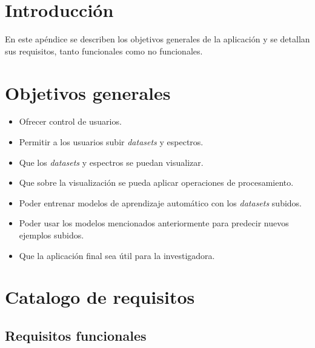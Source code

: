 
\section{Introducción}

En este apéndice se describen los objetivos generales de la aplicación y se 
detallan sus requisitos, tanto funcionales como no funcionales.

\section{Objetivos generales}

\begin{itemize}
	\item Ofrecer control de usuarios.
	\item Permitir a los usuarios subir \textit{datasets} y espectros.
	\item Que los \textit{datasets} y espectros se puedan visualizar.
	\item Que sobre la visualización se pueda aplicar operaciones de 
	procesamiento.
	\item Poder entrenar modelos de aprendizaje automático con los
	\textit{datasets} subidos.
	\item Poder usar los modelos mencionados anteriormente para predecir nuevos
	ejemplos subidos.
	\item Que la aplicación final sea útil para la investigadora.
\end{itemize}

\section{Catalogo de requisitos}

\subsection{Requisitos funcionales}

